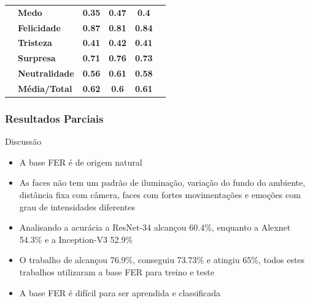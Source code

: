 \documentclass{beamer}
\begin{document}
\begin{frame}
\begin{table}[]
\begin{tabular}{llcccc}
                                       & \textbf{Medo}         & \textbf{0.35}                         & \textbf{0.47}                          & \textbf{0.4}                          &                                       \\
                                       & \textbf{Felicidade}   & \textbf{0.87}                         & \textbf{0.81}                          & \textbf{0.84}                         &                                       \\
                                       & \textbf{Tristeza}     & \textbf{0.41}                         & \textbf{0.42}                          & \textbf{0.41}                         &                                       \\
                                       & \textbf{Surpresa}     & \textbf{0.71}                         & \textbf{0.76}                          & \textbf{0.73}                         &                                       \\
                                       & \textbf{Neutralidade} & \textbf{0.56}                         & \textbf{0.61}                          & \textbf{0.58}                         &                                       \\
                                       & \textbf{Média/Total}  & \textbf{0.62}                         & \textbf{0.6}                           & \textbf{0.61}                         &                                       \\ \hline
\end{tabular}
\end{table}
\end{frame}


\begin{frame}
\frametitle{Resultados Parciais}
 \begin{block}{Discussão}
\begin{itemize}
\pause
\item A base FER é de origem natural
\pause
\item As faces não tem um padrão de iluminação, variação do fundo do ambiente, distância fixa com câmera, faces com fortes movimentações e emoções com grau de intensidades diferentes
\pause
\item Analisando a acurácia a ResNet-34 alcançou 60.4\%, enquanto a Alexnet 54.3\% e a Inception-V3 52.9\%

\pause
\item O trabalho de \cite{art7} alcançou 76.9\%, \cite{kim2016fusing} conseguiu 73.73\% e \cite{art5} atingiu 65\%, todos estes trabalhos utilizaram a base FER para treino e teste
\pause
\item A base FER é difícil para ser aprendida e classificada

\end{itemize}
\end{block}
\end{frame}
\end{document}
